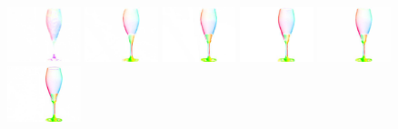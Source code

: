     \\
    \includegraphics[width=0.160\textwidth]{ch-tomnet/images/Ablation/FlowSup_290_shape0000000040937_fcolor_crop.jpg}
    \includegraphics[width=0.160\textwidth]{ch-tomnet/images/Ablation/crosslink_290_shap4_000000040937_fcolor_crop.jpg}
    \includegraphics[width=0.160\textwidth]{ch-tomnet/images/Ablation/multiscale_290_sha14_000000040937_fcolor_crop.jpg}
    \includegraphics[width=0.160\textwidth]{ch-tomnet/images/Ablation/recons_290_shape0000000040937_fcolor_crop.jpg}
    \includegraphics[width=0.160\textwidth]{ch-tomnet/images/Ablation/coarse_290_shape0000000040937_fcolor_crop.jpg}
    \includegraphics[width=0.160\textwidth]{ch-tomnet/images/Ablation/ablation_290_shape_000000040937_fcolor_crop.jpg}
    \\
